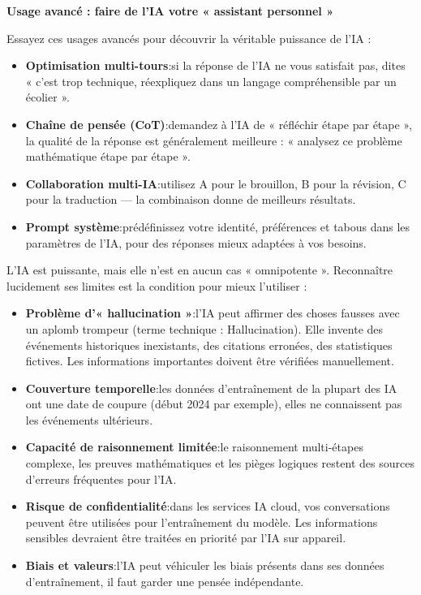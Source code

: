 \textbf{Usage avancé : faire de l'IA votre « assistant personnel »}\par

Essayez ces usages avancés pour découvrir la véritable puissance de l'IA :

\begin{itemize}
  \item \textbf{Optimisation multi-tours}:si la réponse de l’IA ne vous satisfait pas, dites « c’est trop technique, réexpliquez dans un langage compréhensible par un écolier ».
  \item \textbf{Chaîne de pensée (CoT)}:demandez à l’IA de « réfléchir étape par étape », la qualité de la réponse est généralement meilleure : « analysez ce problème mathématique étape par étape ».
  \item \textbf{Collaboration multi-IA}:utilisez A pour le brouillon, B pour la révision, C pour la traduction — la combinaison donne de meilleurs résultats.
  \item \textbf{Prompt système}:prédéfinissez votre identité, préférences et tabous dans les paramètres de l’IA, pour des réponses mieux adaptées à vos besoins.
\end{itemize}


L'IA est puissante, mais elle n'est en aucun cas « omnipotente ». Reconnaître lucidement ses limites est la condition pour mieux l'utiliser :

\begin{itemize}
  \item \textbf{Problème d’« hallucination »}:l’IA peut affirmer des choses fausses avec un aplomb trompeur (terme technique : Hallucination). Elle invente des événements historiques inexistants, des citations erronées, des statistiques fictives. Les informations importantes doivent être vérifiées manuellement.
  \item \textbf{Couverture temporelle}:les données d’entraînement de la plupart des IA ont une date de coupure (début 2024 par exemple), elles ne connaissent pas les événements ultérieurs.
  \item \textbf{Capacité de raisonnement limitée}:le raisonnement multi-étapes complexe, les preuves mathématiques et les pièges logiques restent des sources d’erreurs fréquentes pour l’IA.
  \item \textbf{Risque de confidentialité}:dans les services IA cloud, vos conversations peuvent être utilisées pour l’entraînement du modèle. Les informations sensibles devraient être traitées en priorité par l’IA sur appareil.
  \item \textbf{Biais et valeurs}:l’IA peut véhiculer les biais présents dans ses données d’entraînement, il faut garder une pensée indépendante.
\end{itemize}

